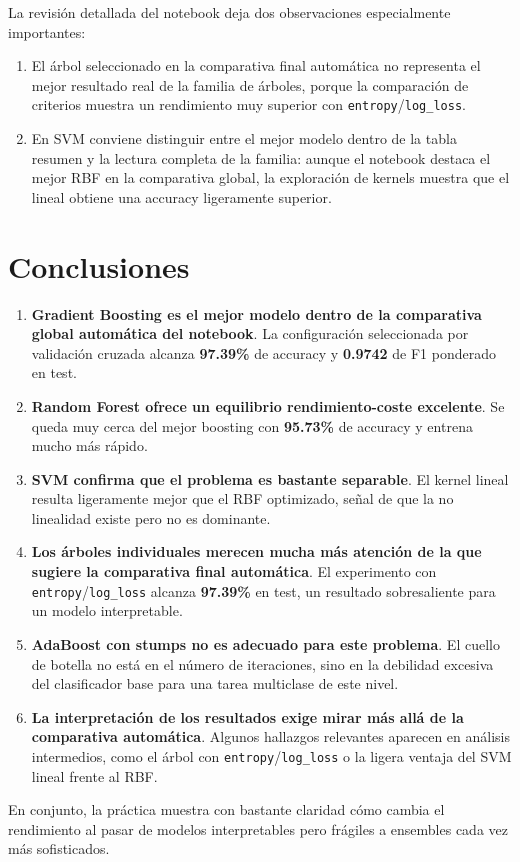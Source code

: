 \documentclass[11pt,a4paper]{article}
\begin{document}
La revisión detallada del notebook deja dos observaciones especialmente importantes:
\begin{enumerate}
    \item El árbol seleccionado en la comparativa final automática no representa el mejor resultado real de la familia de árboles, porque la comparación de criterios muestra un rendimiento muy superior con \texttt{entropy}/\texttt{log\_loss}.
    \item En SVM conviene distinguir entre el mejor modelo dentro de la tabla resumen y la lectura completa de la familia: aunque el notebook destaca el mejor RBF en la comparativa global, la exploración de kernels muestra que el lineal obtiene una accuracy ligeramente superior.
\end{enumerate}

\section{Conclusiones}

\begin{enumerate}
    \item \textbf{Gradient Boosting es el mejor modelo dentro de la comparativa global automática del notebook}. La configuración seleccionada por validación cruzada alcanza \textbf{97.39\%} de accuracy y \textbf{0.9742} de F1 ponderado en test.

    \item \textbf{Random Forest ofrece un equilibrio rendimiento-coste excelente}. Se queda muy cerca del mejor boosting con \textbf{95.73\%} de accuracy y entrena mucho más rápido.

    \item \textbf{SVM confirma que el problema es bastante separable}. El kernel lineal resulta ligeramente mejor que el RBF optimizado, señal de que la no linealidad existe pero no es dominante.

    \item \textbf{Los árboles individuales merecen mucha más atención de la que sugiere la comparativa final automática}. El experimento con \texttt{entropy}/\texttt{log\_loss} alcanza \textbf{97.39\%} en test, un resultado sobresaliente para un modelo interpretable.

    \item \textbf{AdaBoost con stumps no es adecuado para este problema}. El cuello de botella no está en el número de iteraciones, sino en la debilidad excesiva del clasificador base para una tarea multiclase de este nivel.

    \item \textbf{La interpretación de los resultados exige mirar más allá de la comparativa automática}. Algunos hallazgos relevantes aparecen en análisis intermedios, como el árbol con \texttt{entropy}/\texttt{log\_loss} o la ligera ventaja del SVM lineal frente al RBF.
\end{enumerate}

En conjunto, la práctica muestra con bastante claridad cómo cambia el rendimiento al pasar de modelos interpretables pero frágiles a ensembles cada vez más sofisticados.
\end{document}
